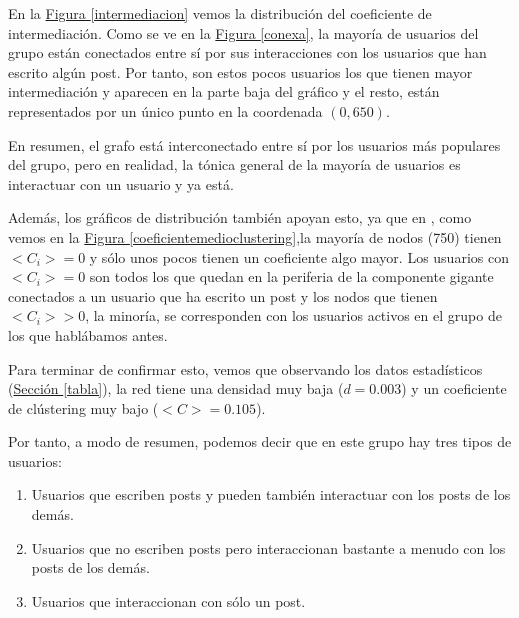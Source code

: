 \documentclass[10pt,a4paper,spanish]{article}
\numberwithin{equation}{section} %
\numberwithin{figure}{section} %
\numberwithin{table}{section} %
\begin{document}
En la \hyperref[intermediacion]{Figura \ref*{intermediacion}} vemos la distribución del coeficiente de intermediación. Como se ve en la \hyperref[conexa]{Figura \ref*{conexa}}, la mayoría de usuarios del grupo están conectados entre sí por sus interacciones con los usuarios que han escrito algún post. Por tanto, son estos pocos usuarios los que tienen mayor intermediación y aparecen en la parte baja del gráfico y el resto, están representados por un único punto en la coordenada $(0,650)$.

En resumen, el grafo está interconectado entre sí por los usuarios más populares del grupo, pero en realidad, la tónica general de la mayoría de usuarios es interactuar con un usuario y ya está.



Además, los gráficos de distribución también apoyan esto, ya que en , como vemos en la \hyperref[coeficientemedioclustering]{Figura \ref*{coeficientemedioclustering}},la mayoría de nodos (750) tienen $<C_i> = 0$ y sólo unos pocos tienen un coeficiente algo mayor. Los usuarios con $<C_i> = 0$ son todos los que quedan en la periferia de la componente gigante conectados a un usuario que ha escrito un post y los nodos que tienen $<C_i> > 0$, la minoría, se corresponden con los usuarios activos en el grupo de los que hablábamos antes. 

Para terminar de confirmar esto, vemos que observando los datos estadísticos (\hyperref[tabla]{Sección \ref*{tabla}}), la red tiene una densidad muy baja ($d=0.003$) y un coeficiente de clústering muy bajo ($<C> = 0.105$). 

Por tanto, a modo de resumen, podemos decir que en este grupo hay tres tipos de usuarios:

\begin{enumerate}[$\bullet$]
    \item Usuarios que escriben posts y pueden también interactuar con los posts de los demás.
    \item Usuarios que no escriben posts pero interaccionan bastante a menudo con los posts de los demás.
    \item Usuarios que interaccionan con sólo un post.
\end{enumerate}
\end{document}
